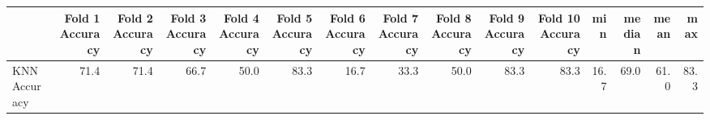 \begin{table}
\centering
\label{KNN_Colon.csv}
\begin{tabular}{lrrrrrrrrrrrrrr}
\toprule
{} &  Fold 1 Accuracy &  Fold 2 Accuracy &  Fold 3 Accuracy &  Fold 4 Accuracy &  Fold 5 Accuracy &  Fold 6 Accuracy &  Fold 7 Accuracy &  Fold 8 Accuracy &  Fold 9 Accuracy &  Fold 10 Accuracy &   min &  median &  mean &   max \\
\midrule
KNN Accuracy &             71.4 &             71.4 &             66.7 &             50.0 &             83.3 &             16.7 &             33.3 &             50.0 &             83.3 &              83.3 &  16.7 &    69.0 &  61.0 &  83.3 \\
\bottomrule
\end{tabular}
\end{table}

